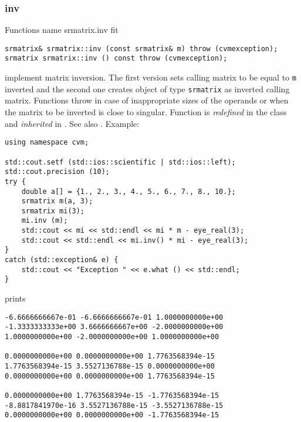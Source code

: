 \subsubsection{inv}
Functions%
\pdfdest name {srmatrix.inv} fit
\begin{verbatim}
srmatrix& srmatrix::inv (const srmatrix& m) throw (cvmexception);
srmatrix srmatrix::inv () const throw (cvmexception);
\end{verbatim}
implement matrix inversion.
The first version sets  calling matrix to be equal to 
\verb"m" inverted and the second one
creates  object of type \verb"srmatrix" as inverted calling matrix.
Functions throw   
in case of inappropriate
sizes of the operands or when the matrix to be inverted is close to
singular.
Function is \emph{redefined} in the class
and \emph{inherited} in .
See also
.
Example:
\begin{Verbatim}
using namespace cvm;

std::cout.setf (std::ios::scientific | std::ios::left); 
std::cout.precision (10);
try {
    double a[] = {1., 2., 3., 4., 5., 6., 7., 8., 10.};
    srmatrix m(a, 3);
    srmatrix mi(3);
    mi.inv (m);
    std::cout << mi << std::endl << mi * m - eye_real(3);
    std::cout << std::endl << mi.inv() * mi - eye_real(3);
}
catch (std::exception& e) {
    std::cout << "Exception " << e.what () << std::endl;
}
\end{Verbatim}
prints
\begin{Verbatim}
-6.6666666667e-01 -6.6666666667e-01 1.0000000000e+00
-1.3333333333e+00 3.6666666667e+00 -2.0000000000e+00
1.0000000000e+00 -2.0000000000e+00 1.0000000000e+00

0.0000000000e+00 0.0000000000e+00 1.7763568394e-15
1.7763568394e-15 3.5527136788e-15 0.0000000000e+00
0.0000000000e+00 0.0000000000e+00 1.7763568394e-15

0.0000000000e+00 1.7763568394e-15 -1.7763568394e-15
-8.8817841970e-16 3.5527136788e-15 -3.5527136788e-15
0.0000000000e+00 0.0000000000e+00 -1.7763568394e-15
\end{Verbatim}
\newpage





